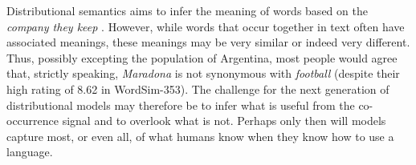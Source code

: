Distributional semantics aims to infer the meaning of words based on the \emph{company they keep} \citep{dist}. However, while words that occur together in text often have associated meanings, these meanings may be very similar or indeed very different. Thus, possibly excepting the population of Argentina, most people would agree that, strictly speaking, \emph{Maradona} is not synonymous with \emph{football} (despite their high rating of 8.62 in WordSim-353). The challenge for the next generation of distributional models may therefore be to infer what is useful from the co-occurrence signal and to overlook what is not. Perhaps only then will models capture most, or even all, of what humans know when they know how to use a language. 